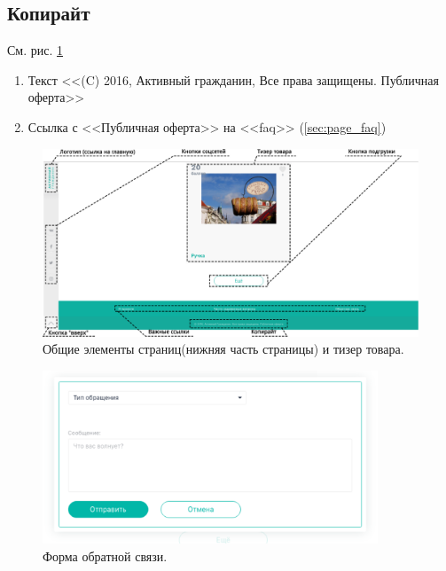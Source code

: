         \subsection{Копирайт}
            \label{sec:baseitems_footer_copiright}
            См. рис. \ref{fig:common_items_2}

            \begin{enumerate}
                \item Текст <<(C) 2016, Активный гражданин, Все права защищены. Публичная оферта>>
                \item Ссылка с <<Публичная оферта>> на <<faq>> (\ref{sec:page_faq})
            \end{enumerate}

        \begin{figure}
            \includegraphics[width=170mm]{02_noauth_funcs/figures/03r.eps}
            \caption{Общие элементы страниц(нижняя часть страницы) и тизер товара.}
            \label{fig:common_items_2}
        \end{figure}
        \begin{figure}[h]
            \center
            \includegraphics[width=100mm]{02_noauth_funcs/figures/04.eps}
            \caption{Форма обратной связи.}
            \label{fig:common_items_3}
        \end{figure}

